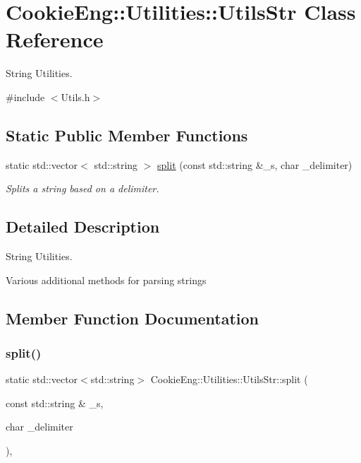 \hypertarget{class_cookie_eng_1_1_utilities_1_1_utils_str}{}\section{Cookie\+Eng\+:\+:Utilities\+:\+:Utils\+Str Class Reference}
\label{class_cookie_eng_1_1_utilities_1_1_utils_str}


String Utilities.  




{\ttfamily \#include $<$Utils.\+h$>$}

\subsection*{Static Public Member Functions}
\begin{DoxyCompactItemize}
\item 
static std\+::vector$<$ std\+::string $>$ \hyperlink{class_cookie_eng_1_1_utilities_1_1_utils_str_af27b9b0359119b7e191a807d276347be}{split} (const std\+::string \&\+\_\+s, char \+\_\+delimiter)
\begin{DoxyCompactList}\small\item\em Splits a string based on a delimiter. \end{DoxyCompactList}\end{DoxyCompactItemize}


\subsection{Detailed Description}
String Utilities. 

Various additional methods for parsing strings 

\subsection{Member Function Documentation}
\mbox{\label{class_cookie_eng_1_1_utilities_1_1_utils_str_af27b9b0359119b7e191a807d276347be}} 
\subsubsection{\texorpdfstring{split()}{split()}}
{\footnotesize\ttfamily static std\+::vector$<$std\+::string$>$ Cookie\+Eng\+::\+Utilities\+::\+Utils\+Str\+::split (\begin{DoxyParamCaption}\item[{const std\+::string \&}]{\+\_\+s,  }\item[{char}]{\+\_\+delimiter }\end{DoxyParamCaption})\hspace{0.3cm}{\ttfamily [inline]}, {\ttfamily [static]}}



